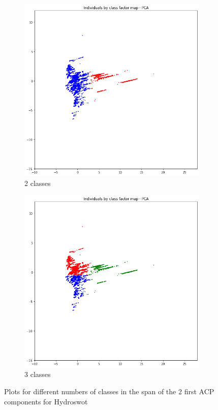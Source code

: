 \begin{figure}[H]
    \begin{subfigure}{0.45 \textwidth}
        \centering
        \includegraphics[scale = 0.3]{Graph/kmeans2HS.png}
        \caption{2 classes}
    \end{subfigure}
\centering
    \begin{subfigure} {0.45 \textwidth}
        \centering
        \includegraphics[scale = 0.3]{Graph/kmeans3HS.png}
        \caption{3 classes}
    \end{subfigure}
\caption{Plots for different numbers of classes in the span of the 2 first ACP components for Hydroswot }
\label{fig:kmeans}
\end{figure}

